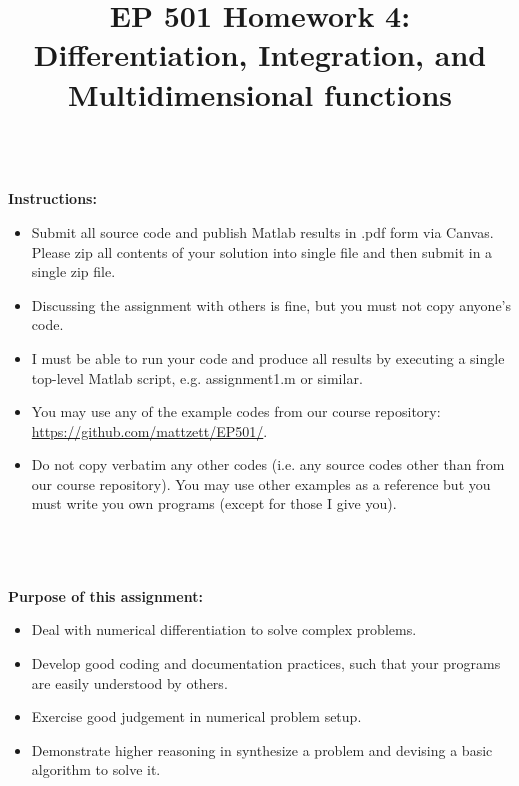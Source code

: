 \documentclass{article}
\begin{document}
\title{EP 501 Homework 4:  Differentiation, Integration, and Multidimensional functions}

\maketitle

~\\
\textbf{Instructions:}  
\begin{itemize}
  \item Submit all source code and publish Matlab results in .pdf form via Canvas.  Please zip all contents of your solution into single file and then submit in a single zip file.    
  \item Discussing the assignment with others is fine, but you must not copy anyone's code.  
  \item I must be able to run your code and produce all results by executing a single top-level Matlab script, e.g. \textsf{assignment1.m} or similar.  
  \item You may use any of the example codes from our course repository:  \url{https://github.com/mattzett/EP501/}.
  \item Do not copy verbatim any other codes (i.e. any source codes other than from our course repository).  You may use other examples as a reference but you must write you own programs (except for those I give you).  

\end{itemize}
~\\~\\~\\
\textbf{Purpose of this assignment:}  
\begin{itemize}
  \item Deal with numerical differentiation to solve complex problems.  
  \item Develop good coding and documentation practices, such that your programs are easily understood by others.  
  \item Exercise good judgement in numerical problem setup.
  \item Demonstrate higher reasoning in synthesize a problem and devising a basic algorithm to solve it.  
\end{itemize}

\pagebreak
\end{document}

